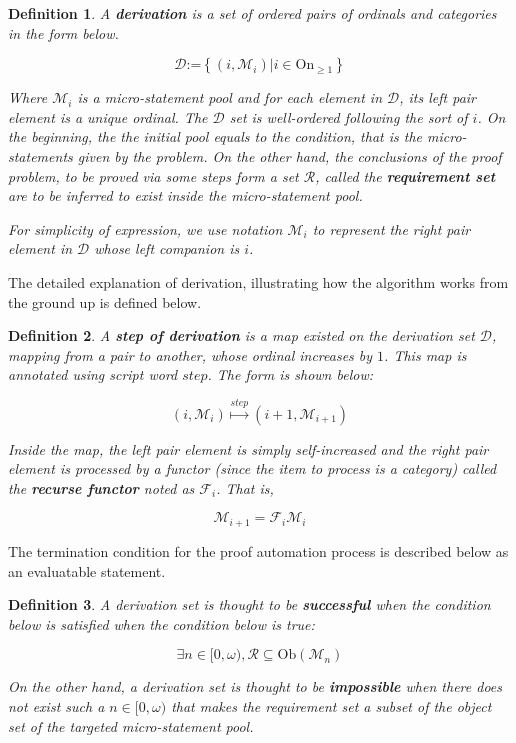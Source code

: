 \documentclass{article}
\newtheorem{definition}{Definition}
\begin{document}
\begin{definition}
	A \textbf{ derivation} is a set of ordered pairs of ordinals and categories in the form below. 
	
	\[\mathcal{D}\text{:=}\left\{\left(i,\mathcal{M}_i\right)|i\in \text{On}_{\geq 1}\right\}\]
	
	Where \(\mathcal{M}_i\) { }is a micro-statement pool and for each element in \(\mathcal{D}\), its left pair element is a unique ordinal. The $\mathcal{D}$ set is well-ordered following the sort of \(i\). On the beginning, the the initial pool equals to the condition, that is the micro-statements given by the problem. On the other hand, the conclusions of the proof problem, to be proved via some steps form a set \(\mathcal{R}\), called the \textbf{requirement set} are to be inferred to exist inside the micro-statement pool.
	
	For simplicity of expression, we use notation \(\mathcal{M}_i\) to represent the right pair element in $\mathcal{D}$ { }whose left companion is \(i\).
\end{definition}

The detailed explanation of derivation, illustrating how the algorithm works from the ground up is defined below.

\begin{definition}
	A \textbf{ step of derivation} is a map existed on the derivation set \(\mathcal{D}\), mapping from a pair to another, whose ordinal increases by \(1\). This map is annotated using script word \(\mathit{s}\mathit{t}\mathit{e}\mathit{p}\). The form is shown below:
	
	\[\left(i,\mathcal{M}_i\right)\overset{\mathit{s}\mathit{t}\mathit{e}\mathit{p}}{\mapsto }\left(i+1,\mathcal{M}_{i+1}\right)\]
	
	Inside the map, the left pair element is simply self-increased and the right pair element is processed by a functor (since the item to process is a category) called the \textbf{ recurse functor} noted as \(\mathcal{F}_i\). That is,
	
	\[\mathcal{M}_{i+1}=\mathcal{F}_i\mathcal{M}_i\]
\end{definition}

The termination condition for the proof automation process is described below as an evaluatable statement. 

\begin{definition}
	A derivation set is thought to be \textbf{ successful} when the condition below is satisfied when the condition below is true:
	
	\[\exists n\in [0,\omega ), \mathcal{R}\subseteq \text{Ob}\left(\mathcal{M}_n\right)\]
	
	On the other hand, a derivation set is thought to be \textbf{ impossible} when there does not exist such a \(n\in [0,\omega )\) that makes the requirement set a subset of the object set of the targeted micro-statement pool.
\end{definition}
\end{document}
